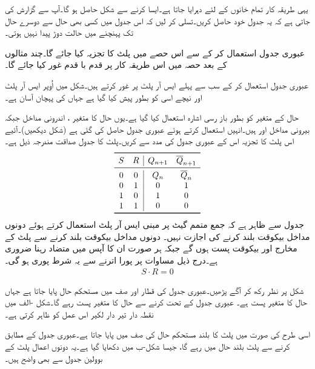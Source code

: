 یہی طریقہ کار تمام خانوں کے لئے دہرایا جاتا ہے۔ایسا کرنے سے شکل  حاصل ہو گا۔آپ سے گزارش کی جاتی ہے کہ یہ جدول خود حاصل کریں۔تسلی کر لیں کہ اس جدول میں کسی بھی حال سے دوسرے حال تک پہنچنے میں حالت دوڑ پیدا نہیں ہوتی۔


عبوری جدول استعمال کر کے سے اس حصے میں پلٹ کا تجزیہ کیا جائے گا۔چند مثالوں کے بعد حصہ  میں اس طریقہ کار پر قدم با قدم غور کیا جائے گا۔

عبوری جدول استعمال کر کے سب سے پہلے ایس آر پلٹ پر غور کرتے ہیں۔شکل  میں اُوپر ایس آر پلٹ اور نیچے اسی کو بطور  پیش کیا گیا ہے جہاں  کی پہچان آسان ہے۔

 حال کے متغیر  کو بطور باز رسی اشارہ  استعمال کیا گیا ہے۔یوں حال کا متغیر ، اندرونی مداخل  جبکہ بیرونی مداخل  اور  ہیں۔انہیں استعمال کرتے ہوئے عبوری جدول حاصل کی گئی ہے (شکل  دیکھیں)۔آئیے اس پلٹ کا تجزیہ اس کے عبوری جدول کی مدد سے کریں۔پلٹ کا جدول صداقت مندرجہ ذیل ہے۔
 \begin{align*}
 \begin{array}{cc|cc}
 \toprule
 S&R&Q_{n+1}&\overline{Q}_{n+1}\\
 \midrule
 0&0&Q_n&\overline{Q}_n\\
 0&1&0&1\\
 1&0&1&0\\
 1&1&0&0\\
 \bottomrule
 \end{array}
\end{align*}
 جدول سے ظاہر ہے کہ جمع متمم گیٹ پر مبنی ایس آر پلٹ استعمال کرتے ہوئے دونوں مداخل بیکوقت بلند کرنے کی اجازت نہیں۔ دونوں مداخل بیکوقت بلند کرنے سے پلٹ کے مخارج  اور  بیکوقت پست ہوں گے جبکہ ہر صورت ان کا آپس میں متضاد رہنا ضروری ہے۔درج ذیل مساوات پر پورا اترنے سے یہ شرط پوری ہو گی۔
 \begin{align}
 S\cdot R=0
 \end{align}

شکل  پر نظر رکھ کر آگے پڑھیں۔عبوری جدول کی  قطار اور  صف میں مستحکم حال پایا جاتا ہے جہاں حال کا متغیر پست  ہے۔ عبوری جدول کے تحت  کرنے سے حال کا متغیر پست رہے گا۔شکل -الف میں نقطہ دار تیر دار لکیر اس عمل کو ظاہر کرتی ہے۔

اسی طرح  کی صورت میں پلٹ کا بلند مستحکم حال  کی صف میں پایا جاتا ہے۔عبوری جدول کے مطابق  کرنے سے پلٹ بلند حال میں رہے گا، جیسا شکل-ب میں دکھایا گیا ہے۔یہ دونوں اعمال پلٹ کے بوولین جدول سے بھی واضح ہیں۔

